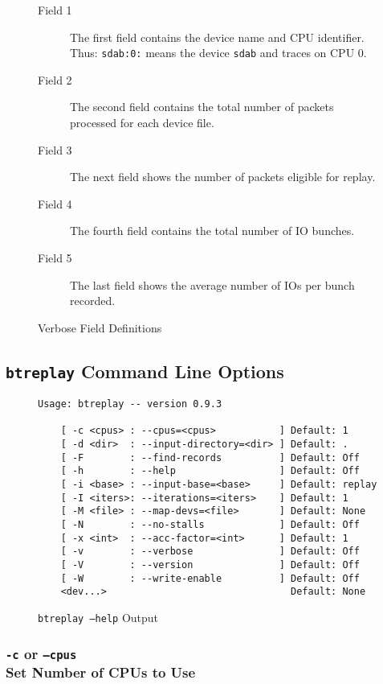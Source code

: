 \documentclass{article}
\begin{document}
\begin{figure}[h!]
\begin{description}
  \item[Field 1] The first field contains the device name and CPU
  identifier. Thus: \texttt{sdab:0:} means the device \texttt{sdab} and
  traces on CPU 0. 

  \item[Field 2] The second field contains the total number of packets
  processed for each device file. 

  \item[Field 3] The next field shows the number of packets eligible for
  replay. 

  \item[Field 4] The fourth field contains the total number of IO bunches. 

  \item[Field 5] The last field shows the average number of IOs per bunch
  recorded.
\end{description}
\caption{\label{fig:verb-defs}Verbose Field Definitions}
\end{figure}
\FloatBarrier

\newpage\subsection{\texttt{btreplay} Command Line Options}
\begin{figure}[h!]
\begin{verbatim}
Usage: btreplay -- version 0.9.3

	[ -c <cpus> : --cpus=<cpus>           ] Default: 1
	[ -d <dir>  : --input-directory=<dir> ] Default: .
	[ -F        : --find-records          ] Default: Off
	[ -h        : --help                  ] Default: Off
	[ -i <base> : --input-base=<base>     ] Default: replay
	[ -I <iters>: --iterations=<iters>    ] Default: 1
	[ -M <file> : --map-devs=<file>       ] Default: None
	[ -N        : --no-stalls             ] Default: Off
	[ -x <int>  : --acc-factor=<int>      ] Default: 1
	[ -v        : --verbose               ] Default: Off
	[ -V        : --version               ] Default: Off
	[ -W        : --write-enable          ] Default: Off
	<dev...>                                Default: None
\end{verbatim}
\caption{\label{fig:btreplay--help}\texttt{btreplay --help} Output}
\end{figure}
\FloatBarrier

\subsubsection{\label{sec:p-o-c}\texttt{-c} or
\texttt{--cpus}\\Set Number of CPUs to Use}
\end{document}
